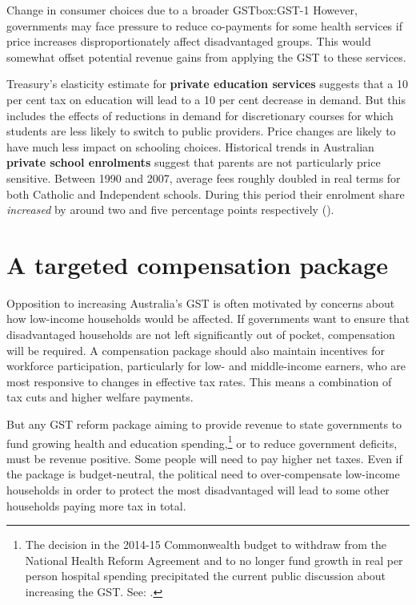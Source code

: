 \documentclass{grattanAlpha}
\begin{document}
\begin{bigboxC*}{Change in consumer choices due to a broader GST}{box:GST-1}
However, governments may face pressure to reduce co-payments for some health services if price increases disproportionately affect disadvantaged groups. This would somewhat offset potential revenue gains from applying the GST to these services. 

Treasury’s elasticity estimate for \textbf{private education services} suggests that a 10 per cent tax on education will lead to a 10 per cent decrease in demand. But this includes the effects of reductions in demand for discretionary courses for which students are less likely to switch to public providers. Price changes are likely to have much less impact on schooling choices. Historical trends in Australian \textbf{private school enrolments} suggest that parents are not particularly price sensitive. Between 1990 and 2007, average fees roughly doubled in real terms for both Catholic and Independent schools. During this period their enrolment share \emph{increased} by around two and five percentage points respectively (\textcite{NousGroup2011-Funding-for-Schooling}). 


\end{bigboxC*}

\chapter{A targeted compensation package}\label{chapter:GST-3}
Opposition to increasing Australia’s GST is often motivated by concerns about how low-income households would be affected. If governments want to ensure that disadvantaged households are not left significantly out of pocket, compensation will be required. A compensation package should also maintain incentives for workforce participation, particularly for low- and middle-income earners, who are most responsive to changes in effective tax rates. This means a combination of tax cuts and higher welfare payments.  

But any GST reform package aiming to provide revenue to state governments to fund growing health and education spending,\footnote{The decision in the 2014-15 Commonwealth budget to withdraw from the National Health Reform Agreement and to no longer fund growth in real per person hospital spending precipitated the current public discussion about increasing the GST. See: \textcite[][18]{DaleyWood2015FiscalChallenges}.}  or to reduce government deficits, must be revenue positive. Some people will need to pay higher net taxes. Even if the package is budget-neutral, the political need to over-compensate low-income households in order to protect the most disadvantaged will lead to some other households paying more tax in total.
\end{document}

